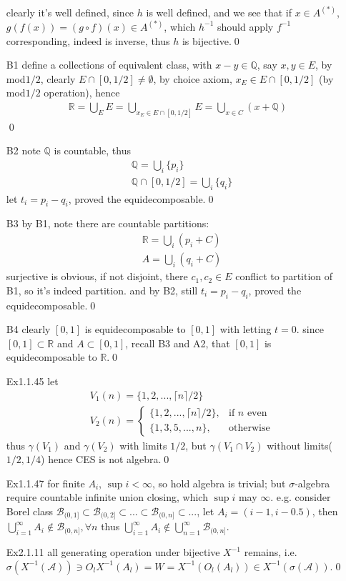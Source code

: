 \documentclass[paper=a4, fontsize=11pt]{scrartcl} %
\numberwithin{equation}{section} %
\numberwithin{figure}{section} %
\numberwithin{table}{section} %
\begin{document}
\begin{itemize}
\begin{align}
	 \end{align}
	 clearly it's well defined, since $h$ is well defined, and we see that if $x\in A^{(*)}$, $g(f(x)) = (g\circ f)(x) \in A^{(*)}$, which $h^{-1}$ should apply $f^{-1}$ corresponding, indeed is inverse, thus $h$ is bijective.\qed
	 \item[B1] define a collections of equivalent class, with $x-y\in \mathbb{Q}$, say $x,y\in E$, by mod$1/2$, clearly $E\cap [0,1/2]\neq \emptyset$, by choice axiom, $x_E\in E\cap [0,1/2]$ (by mod$1/2$ operation), hence
	 \begin{align}
	 	\mathbb{R} = \bigcup_{E} E = \bigcup_{x_E\in E\cap [0,1/2]} E = \bigcup_{x\in C}(x+\mathbb{Q})
	 \end{align}\qed
	 \item[B2] note $\mathbb{Q}$ is countable, thus
	 \begin{align}
	 	&\mathbb{Q} = \bigcup_i \{p_i\} \\
	 	&\mathbb{Q}\cap [0,1/2] = \bigcup_i \{q_i\}
	 \end{align}
	 let $t_i = p_i-q_i$, proved the equidecomposable.\qed
	 \item[B3] by B1, note there are countable partitions:
	 \begin{align}
	 	&\mathbb{R}  =  \bigcup_i (p_i + C)\\
	 	&A = \bigcup_i(q_i+C)
	 \end{align}
	 surjective is obvious, if not disjoint, there $c_1,c_2\in E$ conflict to partition of B1, so it's indeed partition. and by B2, still $t_i=p_i-q_i$, proved the equidecomposable.\qed
	 \item[B4] clearly $[0,1]$ is equidecomposable to $[0,1]$ with letting $t=0$. since $[0,1]\subset \mathbb{R}$ and $A\subset [0,1]$, recall B3 and A2, that $[0,1]$ is equidecomposable to $\mathbb{R}$.\qed
	 \item[Ex1.1.45] let 
	 \begin{align}
	 	&V_1(n) = \{1,2,...,\lceil n \rceil/2\}\\
	 	&V_2(n) = \begin{cases} \{1,2,...,\lceil n \rceil/2\}, &\mbox{if $n$ even}\\
	 		\{1,3,5,...,n\}, &\mbox{otherwise}\end{cases}
	 \end{align}
	 thus $\gamma(V_1)$ and $\gamma(V_2)$ with limits $1/2$, but $\gamma(V_1\cap V_2)$ without limits($1/2,1/4$) hence CES is not algebra.\qed
	 \item[Ex1.1.47] for finite $A_i$, $\sup i<\infty$, so hold algebra is trivial; but $\sigma$-algebra require countable infinite union closing, which $\sup i$ may $\infty$. e.g. consider Borel class $\mathcal{B}_{(0,1]}\subset\mathcal{B}_{(0,2]}\subset...\subset\mathcal{B}_{(0,n]}\subset...$, let $A_i=(i-1, i-0.5)$, then $\bigcup_{i=1}^\infty A_i\notin \mathcal{B}_{(0,n]},\forall n$ thus $\bigcup_{i=1}^\infty A_i\notin \bigcup_{n=1}^\infty \mathcal{B}_{(0,n]}$.
	 \item[Ex2.1.11] all generating operation under bijective $X^{-1}$ remains, i.e. $\sigma(X^{-1}(\mathcal{A}))\ni O_l X^{-1} (A_l) =W= X^{-1}(O_l (A_l))\in X^{-1}(\sigma(\mathcal{A}))$.\qed
\end{itemize}
\end{document}
